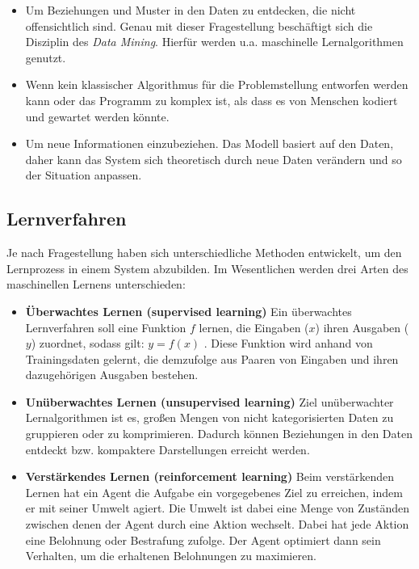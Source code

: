 \begin{itemize}
	\item Um Beziehungen und Muster in den Daten zu entdecken, die nicht offensichtlich sind. Genau mit dieser Fragestellung beschäftigt sich die Disziplin des \textit{Data Mining}. Hierfür werden u.a. maschinelle Lernalgorithmen genutzt.
	\item Wenn kein klassischer Algorithmus für die Problemstellung entworfen werden kann oder das Programm zu komplex ist, als dass es von Menschen kodiert und gewartet werden könnte.
	\item Um neue Informationen einzubeziehen. Das Modell basiert auf den Daten, daher kann das System sich theoretisch durch neue Daten verändern und so der Situation anpassen.
\end{itemize}

\subsection{Lernverfahren}

Je nach Fragestellung haben sich unterschiedliche Methoden entwickelt, um den Lernprozess in einem System abzubilden. Im Wesentlichen werden drei Arten des maschinellen Lernens unterschieden:

\begin{itemize}
	\item \textbf{Überwachtes Lernen (supervised learning)} Ein überwachtes Lernverfahren soll eine Funktion $f$ lernen, die Eingaben ($x$) ihren Ausgaben ($y$) zuordnet, sodass gilt: $y = f(x)$ . Diese Funktion wird anhand von Trainingsdaten gelernt, die demzufolge aus Paaren von Eingaben und ihren dazugehörigen Ausgaben bestehen.
	\item \textbf{Unüberwachtes Lernen (unsupervised learning)} Ziel unüberwachter Lernalgorithmen ist es, großen Mengen von nicht kategorisierten Daten zu gruppieren oder zu komprimieren. Dadurch können Beziehungen in den Daten entdeckt bzw. kompaktere Darstellungen erreicht werden.
	\item \textbf{Verstärkendes Lernen (reinforcement learning)} Beim verstärkenden Lernen hat ein Agent die Aufgabe ein vorgegebenes Ziel zu erreichen, indem er mit seiner Umwelt agiert. Die Umwelt ist dabei eine Menge von Zuständen zwischen denen der Agent durch eine Aktion wechselt. Dabei hat jede Aktion eine Belohnung oder Bestrafung zufolge. Der Agent optimiert dann sein Verhalten, um die erhaltenen Belohnungen zu maximieren.
\end{itemize}

